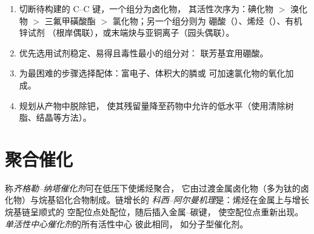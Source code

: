 \begin{method}[选择交叉偶联方法]\label{met:b3:homogeneous-catalysis:choose-coupling}
\begin{enumerate}
  \item 切断待构建的 C--C 键，一个组分为卤化物，
        其活性次序为：碘化物 $>$ 溴化物 $>$ 三氟甲磺酸酯 $>$ 氯化物；另一个组分则为
        硼酸（）、烯烃（）、有机锌试剂
        （根岸偶联），或末端炔与亚铜离子（园头偶联）。
  \item 优先选用试剂稳定、易得且毒性最小的组分对：
        联芳基宜用硼酸。
  \item 为最困难的步骤选择配体：富电子、体积大的膦或
        可加速氯化物的氧化加成。
  \item 规划从产物中脱除钯，
        使其残留量降至药物中允许的低水平（使用清除树脂、结晶等方法）。
\end{enumerate}
\end{method}

\section{聚合催化}

\begin{definition}\label{def:b3:homogeneous-catalysis:ziegler-natta}
称\emph{齐格勒–纳塔催化剂}可在低压下使烯烃聚合，
它由过渡金属卤化物（多为钛的卤化物）与烷基铝化合物制成。链增长的
\emph{科西–阿尔曼机理}是：烯烃在金属上与增长烷基链呈顺式的
空配位点处配位，随后插入金属–碳键，
使空配位点重新出现。
\emph{单活性中心催化剂}的所有活性中心
彼此相同，
如分子型催化剂。
\end{definition}

